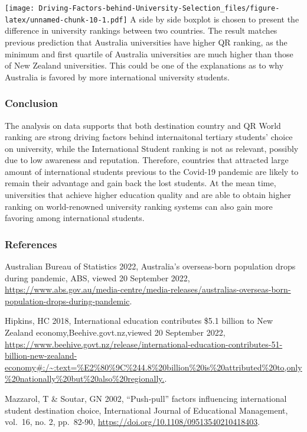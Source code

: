 \documentclass[
]{article}
\begin{document}
\texttt{[image: Driving-Factors-behind-University-Selection\_files/figure-latex/unnamed-chunk-10-1.pdf]}
A side by side boxplot is chosen to present the difference in university
rankings between two countries. The result matches previous prediction
that Australia universities have higher QR ranking, as the minimum and
first quartile of Australia universities are much higher than those of
New Zealand universities. This could be one of the explanations as to
why Australia is favored by more international university students.

\hypertarget{conclusion}{%
\subsubsection{Conclusion}\label{conclusion}}

The analysis on data supports that both destination country and QR World
ranking are strong driving factors behind internaitonal tertiary
students' choice on university, while the International Student ranking
is not as relevant, possibly due to low awareness and reputation.
Therefore, countries that attracted large amount of international
students previous to the Covid-19 pandemic are likely to remain their
advantage and gain back the lost students. At the mean time,
universities that achieve higher education quality and are able to
obtain higher ranking on world-renowned university ranking systems can
also gain more favoring among international students.

\hypertarget{references}{%
\subsubsection{References}\label{references}}

Australian Bureau of Statistics 2022, Australia's overseas-born
population drops during pandemic, ABS, viewed 20 September 2022,
\url{https://www.abs.gov.au/media-centre/media-releases/australias-overseas-born-population-drops-during-pandemic}.

Hipkins, HC 2018, International education contributes \$5.1 billion to
New Zealand economy,Beehive.govt.nz,viewed 20 September 2022,
\url{https://www.beehive.govt.nz/release/international-education-contributes-51-billion-new-zealand-economy\#:/~:text=\%E2\%80\%9C\%244.8\%20billion\%20is\%20attributed\%20to,only\%20nationally\%20but\%20also\%20regionally.}.

Mazzarol, T \& Soutar, GN 2002, ``Push‐pull'' factors influencing
international student destination choice, International Journal of
Educational Management, vol.~16, no. 2, pp.~82-90,
\url{https://doi.org/10.1108/09513540210418403}.
\end{document}
